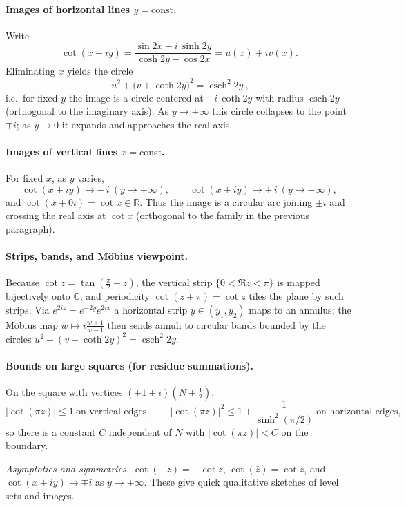 \documentclass[11pt,a4paper]{article}
\theoremstyle{definition}
\theoremstyle{definition}
\theoremstyle{plain}
\theoremstyle{remark}
\DeclareMathOperator{\csch}{csch} %
\begin{document}
\medskip
\paragraph{Images of horizontal lines $y=\text{const}$.}
Write
\[
\cot(x+iy)=\frac{\sin 2x - i\,\sinh 2y}{\cosh 2y - \cos 2x}=u(x)+iv(x).
\]
Eliminating $x$ yields the circle
\[
\boxed{\ u^2+\big(v+\coth 2y\big)^2=\csch^2 2y\ },
\]
i.e.\ for fixed $y$ the image is a circle centered at $-i\,\coth 2y$ with radius $\csch 2y$ (orthogonal to the imaginary axis). As $y\to\pm\infty$ this circle collapses to the point $\mp i$; as $y\to0$ it expands and approaches the real axis.

\medskip
\paragraph{Images of vertical lines $x=\text{const}$.}
For fixed $x$, as $y$ varies,
\[
\cot(x+iy)\to -\,i\ (y\to+\infty),\qquad \cot(x+iy)\to +\,i\ (y\to-\infty),
\]
and $\cot(x+0i)=\cot x\in\mathbb R$. Thus the image is a circular arc joining $\pm i$ and crossing the real axis at $\cot x$ (orthogonal to the family in the previous paragraph).

\medskip
\paragraph{Strips, bands, and Möbius viewpoint.}
Because $\cot z=\tan(\tfrac{\pi}{2}-z)$, the vertical strip $\{0<\Re z<\pi\}$ is mapped bijectively onto $\mathbb C$, and periodicity $\cot(z+\pi)=\cot z$ tiles the plane by such strips.
Via $e^{2iz}=e^{-2y}e^{2ix}$ a horizontal strip $y\in(y_1,y_2)$ maps to an annulus; the Möbius map $w\mapsto i\frac{w+1}{w-1}$ then sends annuli to circular bands bounded by the circles $u^2+(v+\coth 2y)^2=\csch^2 2y$.

\medskip
\paragraph{Bounds on large squares (for residue summations).}
On the square with vertices $(\pm1\pm i)(N+\tfrac12)$,
\[
|\cot(\pi z)|\le 1 \ \text{on vertical edges},\qquad
|\cot(\pi z)|^2\le 1+\frac{1}{\sinh^2(\pi/2)} \ \text{on horizontal edges},
\]
so there is a constant $C$ independent of $N$ with $|\cot(\pi z)|<C$ on the boundary.

\medskip
\emph{Asymptotics and symmetries.}
$\cot(-z)=-\cot z$, $\overline{\cot(\bar z)}=\cot z$, and $\cot(x+iy)\to\mp i$ as $y\to\pm\infty$.
These give quick qualitative sketches of level sets and images.
	
\end{document}
